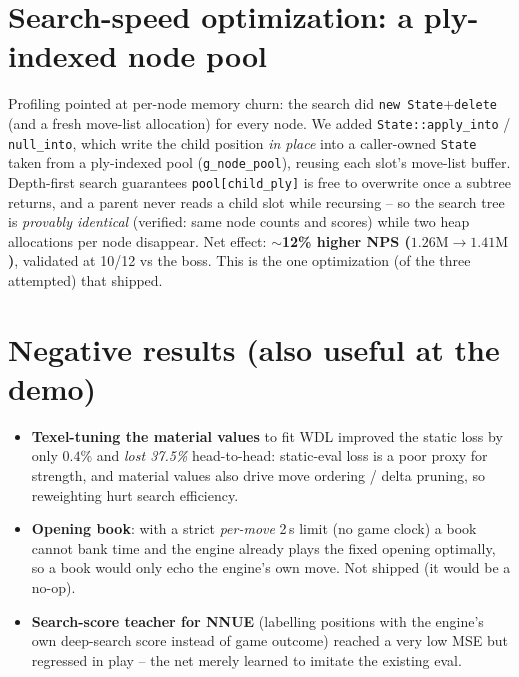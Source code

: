 \documentclass[11pt]{article}
\newcommand{\code}[1]{\texttt{#1}}
\begin{document}
\section{Search-speed optimization: a ply-indexed node pool}
Profiling pointed at per-node memory churn: the search did \code{new
State}+\code{delete} (and a fresh move-list allocation) for every node. We added
\code{State::apply\_into} / \code{null\_into}, which write the child position
\emph{in place} into a caller-owned \code{State} taken from a ply-indexed pool
(\code{g\_node\_pool}), reusing each slot's move-list buffer. Depth-first search
guarantees \code{pool[child\_ply]} is free to overwrite once a subtree returns,
and a parent never reads a child slot while recursing -- so the search tree is
\emph{provably identical} (verified: same node counts and scores) while two heap
allocations per node disappear. Net effect: \textbf{$\sim$12\% higher NPS
($1.26\text{M}\to1.41\text{M}$)}, validated at 10/12 vs the boss. This is the one
optimization (of the three attempted) that shipped.

\section{Negative results (also useful at the demo)}
\begin{itemize}[nosep]
  \item \textbf{Texel-tuning the material values} to fit WDL improved the static
        loss by only $0.4\%$ and \emph{lost 37.5\%} head-to-head: static-eval
        loss is a poor proxy for strength, and material values also drive move
        ordering / delta pruning, so reweighting hurt search efficiency.
  \item \textbf{Opening book}: with a strict \emph{per-move} 2\,s limit (no game
        clock) a book cannot bank time and the engine already plays the fixed
        opening optimally, so a book would only echo the engine's own move. Not
        shipped (it would be a no-op).
  \item \textbf{Search-score teacher for NNUE} (labelling positions with the
        engine's own deep-search score instead of game outcome) reached a very
        low MSE but regressed in play -- the net merely learned to imitate the
        existing eval.
\end{itemize}
\end{document}
